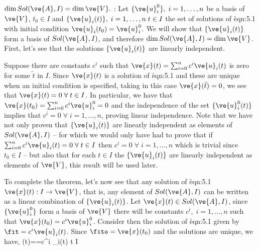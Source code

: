 \espa
\bteo 
$\dim Sol(\ve{A},I) = \dim \ve{V}.$
\eteo
\espa
\pru: 
Let $\{\ve{u}^0_i\}, \; i=1,\ldots,n$ be a basis of $\ve{V}$,
$t_0 \in I$ and $\{\ve{u}_i(t)\}, \; i=1,\ldots,n \; t \in I$ the set of solutions of \r{eqn:5.1} with initial condition $\ve{u}_i(t_0)=\ve{u}_i^0.$
We will show that $\{\ve{u}_i(t)\}$ form a basis of $Sol(\ve{A},I)$, and therefore 
$\dim Sol(\ve{A},I) = \dim \ve{V}$. 
First, let's see that the solutions $\{\ve{u}_i(t)\}$ are linearly independent.

Suppose there are constants $c^i$ such that 
$\ve{x}(t) = \sum_{i=0}^{n}c^i \ve{u}_i(t)$ 
is zero for some $\tilde t$ in $I$. 
Since $\ve{x}(t)$ is a solution of \r{eqn:5.1} and these are unique when an initial condition is specified, taking in this case $\ve{x}(\tilde t)=0$, we see that $\ve{x}(t)=0 \; \forall \; t \in I$. 
In particular, we have that $\ve{x}(t_0) = \sum_{i=0}^{n}c^i \ve{u}_i^0=0$ and the independence of the set $\{\ve{u}_i^0(t)\}$ implies that $c^i=0 \; \forall \; i=1,\ldots,n$, proving linear independence. 
Note that we have not only proven that $\{\ve{u}_i(t)\}$ are linearly independent as elements of $Sol(\ve{A},I)$ -- for which we would only have had to prove that if $\sum_{i=0}^{n} c^i \ve{u}_i(t)=0 \; \forall \; t \in I$ then $c^i=0 \; \forall \; i=1,\ldots,n$ which is trivial since $t_0 \in I$ -- but also that for each $t \in I$ the $\{\ve{u}_i(t)\}$ are linearly independent as elements of $\ve{V}$, this result will be used later.

To complete the theorem, let's now see that any solution of \r{eqn:5.1} $\ve{x}(t): I \to \ve{V}$, that is, any element of $Sol(\ve{A},I)$ can be written as a linear combination of $\{\ve{u}_i(t)\}$. Let $\ve{x}(t) \in Sol(\ve{A},I)$, since $\{\ve{u}^0_i\}$ form a basis of $\ve{V}$ there will be constants $c^i, \; i=1,\ldots,n$ such that $\ve{x}(t_0)=c^i \ve{u}^0_i$. Consider then the solution of \r{eqn:5.1} given by $\fit=c^i \ve{u}_i(t)$. Since $\fito=\ve{x}(t_0)$ and the solutions are unique, we have,
\beq
{}(t)=\fit=c^i _i(t) \; \forall \; t \in I
\eeq
\espa

